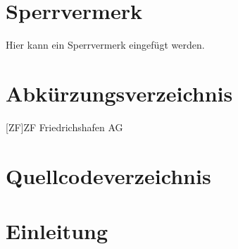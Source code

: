 \documentclass[11pt, a4paper]{article}
\begin{document}
    

    \section*{Sperrvermerk}
    Hier kann ein Sperrvermerk eingefügt werden.
    \thispagestyle{empty}    
    \cleardoublepage

    \setcounter{page}{1}
    \tableofcontents
    \cleardoublepage

    \section*{Abkürzungsverzeichnis}
    \thispagestyle{fancy}
	\begin{acronym}[\hspace{4cm}]
		[ZF]{ZF Friedrichshafen AG}
	\end{acronym}
    \cleardoublepage

    \listoffigures
    \thispagestyle{fancy}
    \cleardoublepage

    \listoftables
    \thispagestyle{fancy}
    \cleardoublepage

    \section*{Quellcodeverzeichnis}
    \listoflistings
    \thispagestyle{fancy}
    \cleardoublepage

    \setcounter{page}{1}
    \section{Einleitung}
\end{document}
